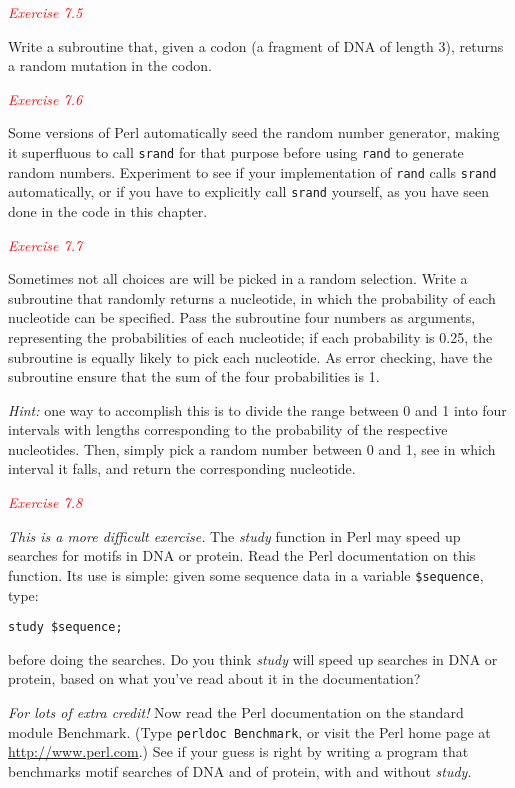 \textcolor{red}{\textit{Exercise 7.5}}
\begin{adjustwidth}{1cm}{}
Write a subroutine that, given a codon (a fragment of DNA of length 3), returns a random mutation in the codon. 
\end{adjustwidth}

\textcolor{red}{\textit{Exercise 7.6}}
\begin{adjustwidth}{1cm}{}
Some versions of Perl automatically seed the random number generator, making it superfluous to call \verb|srand| for that purpose before using \verb|rand| to generate random numbers. Experiment to see if your implementation of \verb|rand| calls \verb|srand| automatically, or if you have to explicitly call \verb|srand| yourself, as you have seen done in the code in this chapter. 
\end{adjustwidth}

\textcolor{red}{\textit{Exercise 7.7}}
\begin{adjustwidth}{1cm}{}
Sometimes not all choices are will be picked in a random selection. Write a subroutine that randomly returns a nucleotide, in which the probability of each nucleotide can be specified. Pass the subroutine four numbers as arguments, representing the probabilities of each nucleotide; if each probability is 0.25, the subroutine is equally likely to pick each nucleotide. As error checking, have the subroutine ensure that the sum of the four probabilities is 1.

\textit{Hint:} one way to accomplish this is to divide the range between 0 and 1 into four intervals with lengths corresponding to the probability of the respective nucleotides. Then, simply pick a random number between 0 and 1, see in which interval it falls, and return the corresponding nucleotide.
\end{adjustwidth}

\textcolor{red}{\textit{Exercise 7.8}}
\begin{adjustwidth}{1cm}{}
\textit{This is a more difficult exercise.} The \textit{study} function in Perl may speed up searches for motifs in DNA or protein. Read the Perl documentation on this function. Its use is simple: given some sequence data in a variable \verb|$sequence|, type:

\begin{lstlisting}
study $sequence;
\end{lstlisting}

before doing the searches. Do you think \textit{study} will speed up searches in DNA or protein, based on what you've read about it in the documentation?
\end{adjustwidth}

\textit{For lots of extra credit!} Now read the Perl documentation on the standard module Benchmark. (Type \verb|perldoc Benchmark|, or visit the Perl home page at \href{http://www.perl.com}{http://www.perl.com}.) See if your guess is right by writing a program that benchmarks motif searches of DNA and of protein, with and without \textit{study}. 
